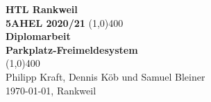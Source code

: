 \begin{titlepage}
  \begin{center}
    \vspace*{1cm}
    \large{\textbf{HTL Rankweil}}\\
    \large{\textbf{5AHEL 2020/21}}
    \vfill
    \line(1,0){400}\\[1mm]
    \huge{\textbf{Diplomarbeit}}\\[3mm]
    \large{\textbf{Parkplatz-Freimeldesystem}}\\[1mm]
    \line(1,0){400}\\
    \vfill
    Philipp Kraft, Dennis Köb und Samuel Bleiner\\[3mm]
    \today, Rankweil
  \end{center}
\end{titlepage}
